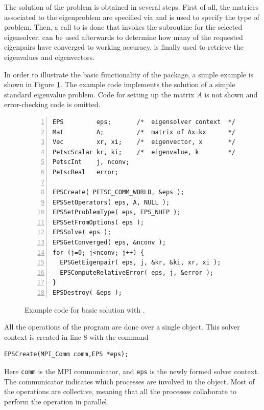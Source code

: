 	The solution of the problem is obtained in several steps. First of all, the matrices associated to the eigenproblem are specified via  and  is used to specify the type of problem. Then, a call to  is done that invokes the subroutine for the selected eigensolver.  can be used afterwards to determine how many of the requested eigenpairs have converged to working accuracy.  is finally used to retrieve the eigenvalues and eigenvectors.

	In order to illustrate the basic functionality of the  package, a simple example is shown in Figure \ref{fig:ex-eps}. The example code implements the solution of a simple standard eigenvalue problem. Code for setting up the matrix $A$ is not shown and error-checking code is omitted.

\begin{figure}
\begin{Verbatim}[fontsize=\small,numbers=left,numbersep=6pt,xleftmargin=15mm]
EPS         eps;       /*  eigensolver context  */
Mat         A;         /*  matrix of Ax=kx      */
Vec         xr, xi;    /*  eigenvector, x       */
PetscScalar kr, ki;    /*  eigenvalue, k        */
PetscInt    j, nconv;
PetscReal   error;

EPSCreate( PETSC_COMM_WORLD, &eps );
EPSSetOperators( eps, A, NULL );
EPSSetProblemType( eps, EPS_NHEP );
EPSSetFromOptions( eps );
EPSSolve( eps );
EPSGetConverged( eps, &nconv );
for (j=0; j<nconv; j++) {
  EPSGetEigenpair( eps, j, &kr, &ki, xr, xi );
  EPSComputeRelativeError( eps, j, &error );
}
EPSDestroy( &eps );
\end{Verbatim}
\caption{\label{fig:ex-eps}Example code for basic solution with .}
\end{figure}

	All the operations of the program are done over a single  object. This solver context is created in line 8 with the command 
	\begin{Verbatim}[fontsize=\small]
	EPSCreate(MPI_Comm comm,EPS *eps);
	\end{Verbatim}
	Here \texttt{comm} is the MPI communicator, and \texttt{eps} is the newly formed solver context. The communicator indicates which processes are involved in the  object. Most of the  operations are collective, meaning that all the processes collaborate to perform the operation in parallel. 

